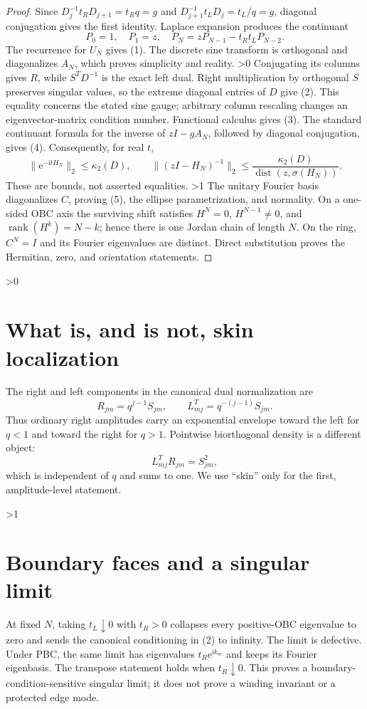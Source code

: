 \documentclass[10pt]{article}
\providecommand{\CRevisionRound}{2}
\newcommand{\ii}{\mathrm{i}}
\newcommand{\e}{\mathrm{e}}
\begin{document}
\begin{proof}
Since $D_j^{-1}t_RD_{j+1}=t_Rq=g$ and
$D_{j+1}^{-1}t_LD_j=t_L/q=g$, diagonal conjugation gives the first identity.
Laplace expansion produces the continuant
\[
 P_0=1,\quad P_1=z,\quad P_N=zP_{N-1}-t_Rt_LP_{N-2}.
\]
The recurrence for $U_N$ gives (1).  The discrete sine transform is
orthogonal and diagonalizes $A_N$, which proves simplicity and reality.
\ifnum\CRevisionRound>0
Conjugating its columns gives $R$, while $S^TD^{-1}$ is the exact left dual.
Right multiplication by orthogonal $S$ preserves singular values, so the
extreme diagonal entries of $D$ give (2).  This equality concerns the stated
sine gauge; arbitrary column rescaling changes an eigenvector-matrix condition
number.  Functional calculus gives (3).  The standard continuant formula for
the inverse of $zI-gA_N$, followed by diagonal conjugation, gives (4).
Consequently, for real $t$,
\[
 \|\e^{-\ii tH_N}\|_2\le\kappa_2(D),\qquad
 \|(zI-H_N)^{-1}\|_2\le
 \frac{\kappa_2(D)}{\operatorname{dist}(z,\sigma(H_N))}.           \tag{6}
\]
These are bounds, not asserted equalities.
\fi
\ifnum\CRevisionRound>1
The unitary Fourier basis diagonalizes $C$, proving (5), the ellipse
parametrization, and normality.  On a one-sided OBC axis the surviving shift
satisfies $H^N=0$, $H^{N-1}\ne0$, and
$\operatorname{rank}(H^k)=N-k$; hence there is one Jordan chain of length
$N$.  On the ring, $C^N=I$ and its Fourier eigenvalues are distinct.  Direct
substitution proves the Hermitian, zero, and orientation statements.
\fi
\end{proof}

\ifnum\CRevisionRound>0
\section{What is, and is not, skin localization}
The right and left components in the canonical dual normalization are
\[
 R_{jm}=q^{j-1}S_{jm},\qquad L^T_{mj}=q^{-(j-1)}S_{jm}.
\]
Thus ordinary right amplitudes carry an exponential envelope toward the left
for $q<1$ and toward the right for $q>1$.  Pointwise biorthogonal density is a
different object:
\[
 L^T_{mj}R_{jm}=S_{jm}^2,
\]
which is independent of $q$ and sums to one.  We use ``skin'' only for the
first, amplitude-level statement.
\fi

\ifnum\CRevisionRound>1
\section{Boundary faces and a singular limit}
At fixed $N$, taking $t_L\downarrow0$ with $t_R>0$ collapses every positive-OBC
eigenvalue to zero and sends the canonical conditioning in (2) to infinity.
The limit is defective.  Under PBC, the same limit has eigenvalues
$t_R\e^{\ii k_m}$ and keeps its Fourier eigenbasis.  The transpose statement
holds when $t_R\downarrow0$.  This proves a boundary-condition-sensitive
singular limit; it does not prove a winding invariant or a protected edge mode.
\end{document}

